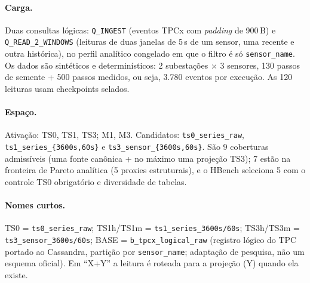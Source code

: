 \documentclass[11pt,a4paper]{article}
\begin{document}
\paragraph{Carga.} Duas consultas lógicas: \texttt{Q\_INGEST} (eventos TPCx com \textit{padding} de 900\,B) e \texttt{Q\_READ\_2\_WINDOWS} (leituras de duas janelas de 5\,s de um sensor, uma recente e outra histórica), no perfil analítico congelado em que o filtro é só \texttt{sensor\_name}. Os dados são sintéticos e determinísticos: 2 subestações $\times$ 3 sensores, 130 passos de semente + 500 passos medidos, ou seja, 3.780 eventos por execução. As 120 leituras usam checkpoints selados.

\paragraph{Espaço.} Ativação: TS0, TS1, TS3; M1, M3. Candidatos: \texttt{ts0\_series\_raw}, \texttt{ts1\_series\_\{3600s,60s\}} e \texttt{ts3\_sensor\_\{3600s,60s\}}. São 9 coberturas admissíveis (uma fonte canônica + no máximo uma projeção TS3); 7 estão na fronteira de Pareto analítica (5 proxies estruturais), e o HBench seleciona 5 com o controle TS0 obrigatório e diversidade de tabelas.

\paragraph{Nomes curtos.} TS0 = \texttt{ts0\_series\_raw}; TS1h/TS1m = \texttt{ts1\_series\_3600s/60s}; TS3h/TS3m = \texttt{ts3\_sensor\_3600s/60s}; BASE = \texttt{b\_tpcx\_logical\_raw} (registro lógico do TPC portado ao Cassandra, partição por \texttt{sensor\_name}; adaptação de pesquisa, não um esquema oficial). Em ``X+Y'' a leitura é roteada para a projeção (Y) quando ela existe.
\end{document}
